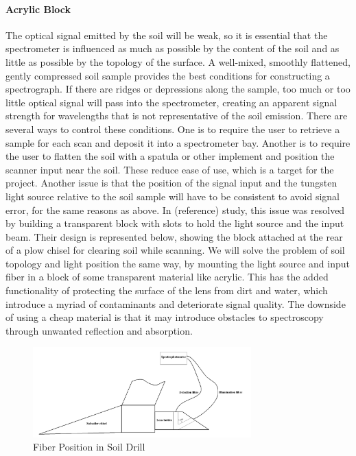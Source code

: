 \paragraph{Acrylic Block} The optical signal emitted by the soil will be weak, so it is essential that the spectrometer is influenced as much as possible by the content of the soil and as little as possible by the topology of the surface. A well-mixed, smoothly flattened, gently compressed soil sample provides the best conditions for constructing a spectrograph. If there are ridges or depressions along the sample, too much or too little optical signal will pass into the spectrometer, creating an apparent signal strength for wavelengths that is not representative of the soil emission. There are several ways to control these conditions. One is to require the user to retrieve a sample for each scan and deposit it into a spectrometer bay. Another is to require the user to flatten the soil with a spatula or other implement and position the scanner input near the soil. These reduce ease of use, which is a target for the project. Another issue is that the position of the signal input and the tungsten light source relative to the soil sample will have to be consistent to avoid signal error, for the same reasons as above. In (reference) study, this issue was resolved by building a transparent block with slots to hold the light source and the input beam. Their design is represented below, showing the block attached at the rear of a plow chisel for clearing soil while scanning. We will solve the problem of soil topology and light position the same way, by mounting the light source and input fiber in a block of some transparent material like acrylic. This has the added functionality of protecting the surface of the lens from dirt and water, which introduce a myriad of contaminants and deteriorate signal quality. The downside of using a cheap material is that it may introduce obstacles to spectroscopy through unwanted reflection and absorption.

\begin{figure}[H]
    \caption{Fiber Position in Soil Drill}
    \centering
    \includegraphics[width=0.75\textwidth]{images/Acrylic Block Fiber positioner.png}
\end{figure}

